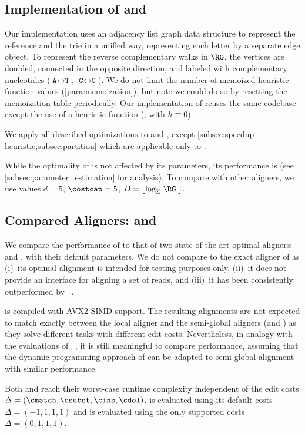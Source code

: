\subsection{Implementation of \astarix and \dijkstra}
Our \astarix implementation uses an adjacency list graph data structure to
represent the reference and the trie in a unified way, representing each letter
by a separate edge object.
To represent the reverse complementary walks in $\RG$, the vertices are doubled,
connected in the opposite direction, and labeled with complementary nucleotides
($\texttt{A} \leftrightarrow \texttt{T}$, $\texttt{C} \leftrightarrow
\texttt{G}$).
%
We do not limit the number of memoized heuristic function values
(\cref{para:memoization}), but note we could do so by resetting the memoization
table periodically.
%
Our implementation of \dijkstra reuses the same \astarix codebase except the
use of a heuristic function (\ie, with $h \equiv 0$).

We apply all described optimizations to \astarix and \dijkstra, except
\cref{subsec:speedup-heuristic,subsec:partition} which are applicable only to
\astarix.

While the optimality of \astarix is not affected by its parameters, its
performance is (see \cref{subsec:parameter_estimation} for analysis). To compare
with other aligners, we use values \mbox{$d=5$}, \mbox{$\costcap=5$}, \mbox{$D =
\lfloor \log_\Sigma \lvert \RG \rvert \rfloor$}.

\subsection{Compared Aligners: \pasgal and \bitparallel}

We compare the performance of \astarix to that of two state-of-the-art optimal
aligners: \pasgal and \bitparallel, with their default parameters.
%
We do not compare to the exact aligner of \vg as (i)~its optimal alignment
is intended for testing purposes only, (ii)~it does not provide an
interface for aligning a set of reads, and (iii)~it has been consistently
outperformed by \pasgal~\cite{jain_accelerating_2019}.

\pasgal is compiled with AVX2 SIMD support. The resulting alignments are not
expected to match exactly between the local aligner \pasgal and the semi-global
aligners (\astarix and \bitparallel) as they solve different tasks with
different edit costs. Nevertheless, in analogy with the evaluations of
\pasgal~\cite{jain_accelerating_2019}, it is still meaningful to compare
performance, assuming that the dynamic programming approach of \pasgal can be
adapted to semi-global alignment with similar performance.

Both \bitparallel and \pasgal reach their worst-case runtime complexity
independent of the edit costs $\Delta=(\cmatch,\csubst,\cins,\cdel)$. \pasgal is
evaluated using its default costs ~$\Delta=(-1,1,1,1)$ and \bitparallel is
evaluated using the only supported costs~$\Delta=(0,1,1,1)$.

